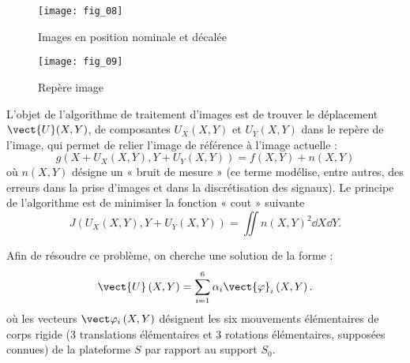 \begin{figure}[H]
\centering
\texttt{[image: fig\_08]}
\caption{\label{fig:08}  Images en position nominale et décalée}
\end{figure}


\begin{figure}[H]
\centering
\texttt{[image: fig\_09]}
\caption{\label{fig:09}  Repère image}
\end{figure}

L’objet de l’algorithme de traitement d’images est de trouver le déplacement $\vect{U}(X,Y)$, de composantes $U_X(X,Y)$ et 
$U_Y(X,Y)$ dans le repère de l’image, qui permet de relier l’image de référence à l’image actuelle :
$$g\left( X + U_X(X,Y),Y + U_Y(X,Y)\right) = f(X,Y)+n(X,Y)$$
où $n(X,Y)$ désigne un « bruit de mesure » (ce terme modélise, entre autres, des erreurs dans la prise d’images et
dans la discrétisation des signaux). Le principe de l’algorithme est de minimiser la fonction « cout » suivante 
$$J\left( U_X(X,Y),Y + U_Y(X,Y)\right) = \iint n(X,Y)^2 \dd X \dd Y.$$

\ifprof
\begin{corrige}
\end{corrige}
\else
\fi

Afin de résoudre ce problème, on cherche une solution de la forme :
$$
\vect{U}\left(X,Y\right)=\sum\limits_{i=1}^{6}\alpha_i \vect{\varphi}_i \left(X,Y\right).
$$
où les vecteurs $\vect\varphi_i \left(X,Y\right)$ désignent les six mouvements élémentaires de corps rigide (3 translations élémentaires et 3 rotations élémentaires, supposées connues) de la plateforme $S$ par rapport au support $S_0$.

\ifprof
\begin{corrige}
\end{corrige}
\else
\fi


\ifprof
\begin{corrige}
\end{corrige}
\else
\fi


